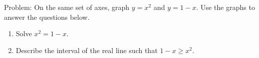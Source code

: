 \documentclass[11pt]{article}
\begin{document}
Problem: On the same set of axes, graph $y=x^2$ and $y=1-x.$ Use the graphs to answer the questions below.
\begin{enumerate}
\item Solve $x^2=1-x.$
\item Describe the interval of the real line such that $1-x \geq x^2.$
\end{enumerate}
\end{document}
